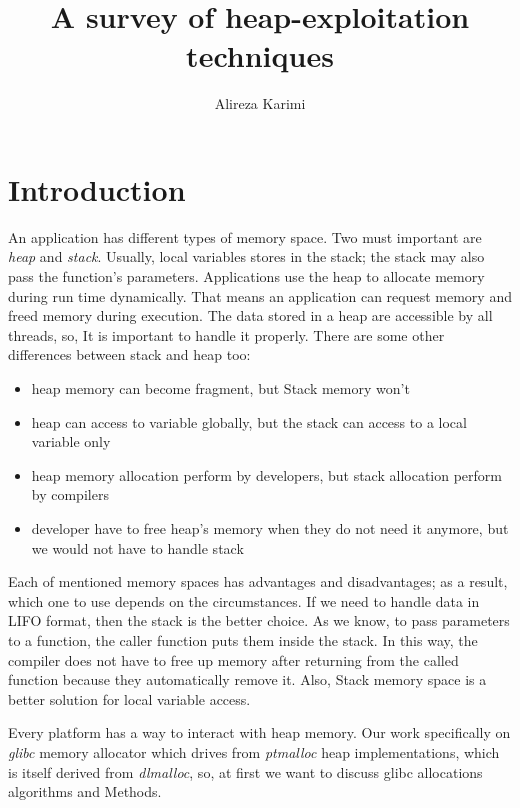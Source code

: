\documentclass{masterthesis}
\newcommand*\libc{glibc}
\begin{document}
\title{A survey of heap-exploitation techniques}

\author{Alireza Karimi}



\maketitle

\tableofcontents

\chapter{Introduction}

An application has different types of memory space. Two must important are \emph{heap} and \emph{stack}. Usually, local variables stores in the stack; the stack may also pass the function's parameters. Applications use the heap to allocate memory during run time dynamically. That means an application can request memory and freed memory during execution. The data stored in a heap are accessible by all threads, so, It is important to handle it properly. There are some other differences between stack and heap too:
\begin{itemize}
	\item heap memory can become fragment, but Stack memory won't
	\item heap can access to variable globally, but the stack can access to a local variable only
	\item heap memory allocation perform by developers, but stack allocation perform by compilers
	\item developer have to free heap's memory when they do not need it anymore, but we would not have to handle stack
\end{itemize}
Each of mentioned memory spaces has advantages and disadvantages; as a result, which one to use depends on the circumstances. If we need to handle data in LIFO format, then the stack is the better choice. As we know, to pass parameters to a function, the caller function puts them inside the stack. In this way, the compiler does not have to free up memory after returning from the called function because they automatically remove it. Also, Stack memory space is a better solution for local variable access.

Every platform has a way to interact with heap memory. Our work specifically on \emph{ \libc{}} memory allocator which drives from \emph{ptmalloc} heap implementations, which is itself derived from \emph{dlmalloc}, so, at first we want to discuss \libc{} allocations algorithms and Methods. 
\end{document}
